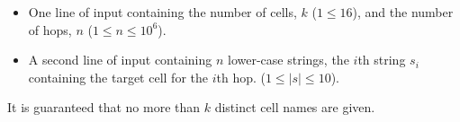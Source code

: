 

\begin{itemize}
  \item One line of input containing the number of cells, $k$ ($1 \le 16$), and the number of hops, $n$ ($1 \le n \le 10^6$).
  \item A second line of input containing $n$ lower-case strings, the $i$\:th string $s_i$ containing
        the target cell for the $i$\:th hop. ($1 \le |s| \le 10$).
\end{itemize}

It is guaranteed that no more than $k$ distinct cell names are given.

